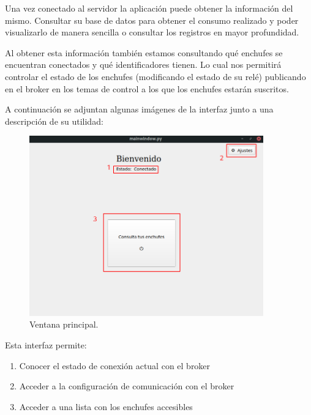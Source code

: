 \documentclass[a4paper,10pt]{article}
\begin{document}
Una vez conectado al servidor la aplicación puede obtener la
información del mismo. Consultar su base de datos para obtener el
consumo realizado y poder visualizarlo de manera sencilla o consultar
los registros en mayor profundidad.

Al obtener esta información también estamos consultando qué enchufes
se encuentran conectados y qué identificadores tienen. Lo cual nos
permitirá controlar el estado de los enchufes (modificando el estado
de su relé) publicando en el broker en los temas de control a los que
los enchufes estarán suscritos.

A continuación se adjuntan algunas imágenes de la interfaz junto a una
descripción de su utilidad:

\begin{figure}[H]
  \centering
  \includegraphics[width=0.9\textwidth]{img/interfaz_main_window.png}
  \caption{Ventana principal.}\label{fig:interfaz-main}
\end{figure}

Esta interfaz permite:

\begin{enumerate}
\item{Conocer el estado de conexión actual con el broker}
\item{Acceder a la configuración de comunicación con el broker}
\item{Acceder a una lista con los enchufes accesibles}
\end{enumerate}
\end{document}
